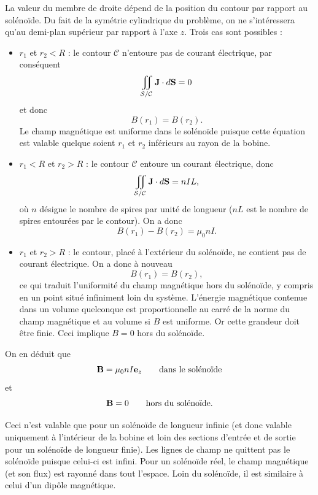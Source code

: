 \documentclass[11pt,a4paper]{report}
\begin{document}
La valeur du membre de droite dépend de la position du contour par rapport au solénoïde. Du fait de la symétrie cylindrique du problème, on ne s'intéressera qu'au demi-plan supérieur par rapport à l'axe $z$. Trois cas sont possibles :
\begin{itemize}
	\item $r_1$ et $r_2 < R$ : le contour $\mathcal{C}$ n'entoure pas de courant électrique, par conséquent 
		\begin{equation}
			\iint_{\mathcal{S}/\mathcal{C}}\bold{J}\cdot d\bold{S} = 0
		\end{equation}
		et donc
		\begin{equation}
			B(r_1) = B(r_2).
		\end{equation}
		Le champ magnétique est uniforme dans le solénoïde puisque cette équation est valable quelque soient $r_1$ et $r_2$ inférieurs au rayon de la bobine.\\
		 
	\item $r_1 < R$ et $r_2 > R$ : le contour $\mathcal{C}$ entoure un courant électrique, donc
		\begin{equation}
			\iint_{\mathcal{S}/\mathcal{C}}\bold{J}\cdot d\bold{S} = n I L,
		\end{equation}
		où $n$ désigne le nombre de spires par unité de longueur ($nL$ est le nombre de spires entourées par le contour). On a donc
		\begin{equation}
			B(r_1) - B(r_2) = \mu_0 n I .
		\end{equation}

	\item $r_1$ et $r_2 > R$ : le contour, placé à l'extérieur du solénoïde, ne contient pas de courant électrique. On a donc à nouveau
		\begin{equation}
			B(r_1) = B(r_2),
		\end{equation}
		ce qui traduit l'uniformité du champ magnétique hors du solénoïde, y compris en un point situé infiniment loin du système. L'énergie magnétique contenue dans un volume quelconque est 		proportionnelle au carré de la norme du champ magnétique et au volume si $B$ est uniforme. Or cette grandeur doit être finie. Ceci implique $B = 0$ hors du solénoïde.
\end{itemize}

On en déduit que 
\begin{equation}
	\bold{B} = \mu_0 n I \bold{e}_z \qquad \text{dans le solénoïde}
\end{equation}
et 
\begin{equation}
	\bold{B} = 0 \qquad \text{hors du solénoïde.}
\end{equation}

Ceci n'est valable que pour un solénoïde de longueur infinie (et donc valable uniquement à l'intérieur de la bobine et loin des sections d'entrée et de sortie pour un solénoïde de longueur finie). Les lignes de champ ne quittent pas le solénoïde puisque celui-ci est infini. Pour un solénoïde réel, le champ magnétique (et son flux) est rayonné dans tout l'espace. Loin du solénoïde, il est similaire à celui d'un dipôle magnétique.  
\end{document}
